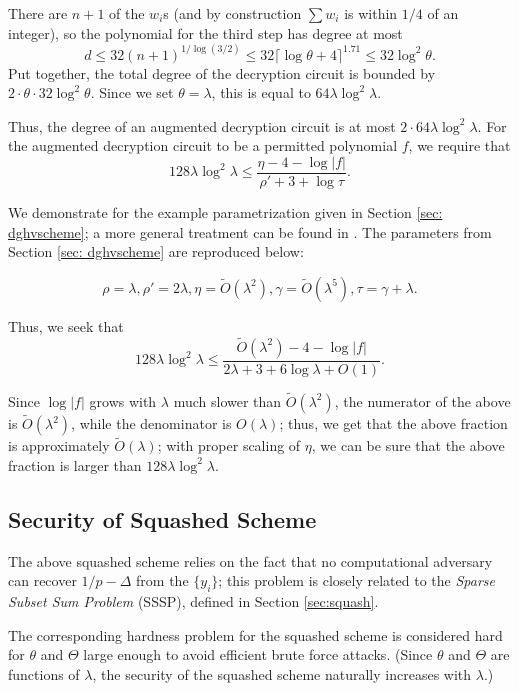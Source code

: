     There are $n + 1$ of the $w_i$s (and by construction $\sum w_i$ is within $1/4$ of an integer), so the polynomial for the third step has degree at most
    \[d \leq 32 (n+1)^{1 / \log(3/2)} \leq 32 \lceil \log \theta + 4 \rceil^{1.71} \leq 32 \log^2 \theta.\]
    Put together, the total degree of the decryption circuit is bounded by $2 \cdot \theta \cdot 32 \log^2 \theta$. Since we set $\theta = \lambda$, this is equal to $64 \lambda \log^2 \lambda$.

    Thus, the degree of an augmented decryption circuit is at most $2 \cdot 64 \lambda \log^2 \lambda$. For the augmented decryption circuit to be a permitted polynomial $f$, we require that
    \[128 \lambda \log^2 \lambda \leq \frac{\eta - 4 - \log |f|}{\rho' + 3 + \log \tau}.\]

    We demonstrate for the example parametrization given in Section \ref{sec: dghvscheme}; a more general treatment can be found in \cite{dghv}. The parameters from Section \ref{sec: dghvscheme} are reproduced below:

    \[\rho = \lambda, \rho' = 2\lambda, \eta = \widetilde{O}(\lambda^2), \gamma = \widetilde{O}(\lambda^5), \tau = \gamma + \lambda.\]

    Thus, we seek that
    \[128 \lambda \log^2 \lambda \leq \frac{\widetilde{O}(\lambda^2) - 4 - \log |f|}{2\lambda + 3 + 6 \log \lambda + O(1)}.\]

    Since $\log |f|$ grows with $\lambda$ much slower than $\widetilde{O}(\lambda^2)$, the numerator of the above is $\widetilde{O}(\lambda^2)$, while the denominator is $O(\lambda)$; thus, we get that the above fraction is approximately $\widetilde{O}(\lambda)$; with proper scaling of $\eta$, we can be sure that the above fraction is larger than $128 \lambda \log^2 \lambda$.

\subsection{Security of Squashed Scheme}
    The above squashed scheme relies on the fact that no computational adversary can recover $1/p - \Delta$ from the $\{y_i\}$; this problem is closely related to the \emph{Sparse Subset Sum Problem} (SSSP), defined in Section \ref{sec:squash}.

    The corresponding hardness problem for the squashed scheme is considered hard for $\theta$ and $\Theta$ large enough to avoid efficient brute force attacks. (Since $\theta$ and $\Theta$ are functions of $\lambda$, the security of the squashed scheme naturally increases with $\lambda$.)

